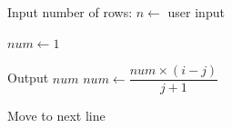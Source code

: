 \begin{algorithm}
\caption{Display Pascal's Triangle}
\begin{algorithmic}[1]

\STATE Input number of rows:
\STATE $n \gets$ user input

    \STATE $num \gets 1$
    
        \STATE Output $num$
        \STATE $num \gets \dfrac{num \times (i-j)}{j+1}$
    \ENDFOR
    
    \STATE Move to next line
\ENDFOR

\end{algorithmic}
\end{algorithm}
